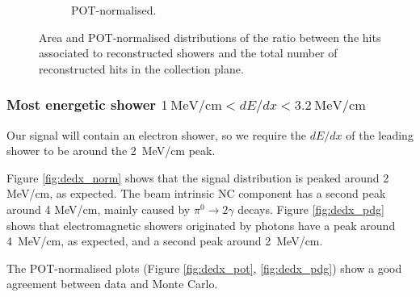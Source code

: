 \begin{figure}[htbp]
\begin{subfigure}{0.49\textwidth}
    \caption{POT-normalised.} \label{fig:ratio_pot}
  \end{subfigure}
  \caption{Area and POT-normalised distributions of the ratio between the hits associated to reconstructed showers and the total number of reconstructed hits in the collection plane.}
\end{figure}


\subsubsection*{Most energetic shower $1~\mathrm{MeV/cm} < dE/dx <3.2~\mathrm{MeV/cm}$}
Our signal will contain an electron shower, so we require the $dE/dx$ of the leading shower to be around the 2~MeV/cm peak.

Figure \ref{fig:dedx_norm} shows that the signal distribution is peaked around 2 MeV/cm, as expected. The beam intrinsic NC component has a second peak around 4 MeV/cm, mainly caused by $\pi^0\rightarrow2\gamma$ decays. 
Figure \ref{fig:dedx_pdg} shows that electromagnetic showers originated by photons have a peak around 4~MeV/cm, as expected, and a second peak around 2~MeV/cm. 

The POT-normalised plots (Figure \ref{fig:dedx_pot}, \ref{fig:dedx_pdg}) show a good agreement between data and Monte Carlo.

